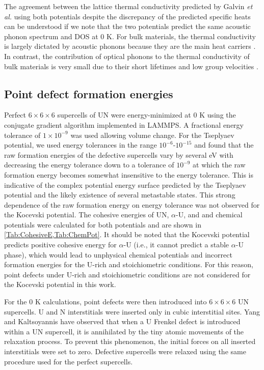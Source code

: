 \documentclass[preprint, 12pt]{elsarticle}
\begin{document}
The agreement between the lattice thermal conductivity predicted by Galvin \textit{et al.} \cite{Galvin2023} using both potentials despite the discrepancy of the predicted specific heats can be understood if we note that the two potentials predict the same acoustic phonon spectrum and DOS at 0 K. For bulk materials, the thermal conductivity is largely dictated by acoustic phonons because they are the main heat carriers \cite{Li2020}. In contrast, the contribution of optical phonons to the thermal conductivity of bulk materials is very small due to their short lifetimes and low group velocities \cite{Tian2011}.



\subsection{Point defect formation energies}

Perfect $6 \times 6 \times 6$ supercells of UN were energy-minimized at 0 K using the conjugate gradient algorithm implemented in LAMMPS. A fractional energy tolerance of $1 \times 10^{-9}$ was used allowing volume change. For the Tseplyaev potential, we used energy tolerances in the range $10^{-6}$-$10^{-15}$ and found that the raw formation energies of the defective supercells vary by several eV with decreasing the energy tolerance down to a tolerance of $10^{-9}$ at which the raw formation energy becomes somewhat insensitive to the energy tolerance. This is indicative of the complex potential energy surface predicted by the Tseplyaev potential and the likely existence of several metastable states. This strong dependence of the raw formation energy on energy tolerance was not observed for the Kocevski potential. The cohesive energies of UN, $\alpha$-U, and  and chemical potentials were calculated for both potentials and are shown in \cref{Tab:CohesiveE,Tab:ChemPot}. It should be noted that the Kocevski potential predicts positive cohesive energy for $\alpha$-U (i.e., it cannot predict a stable $\alpha$-U phase), which would lead to unphysical chemical potentials and incorrect formation energies for the U-rich and stoichiometric conditions. For this reason, point defects under U-rich and stoichiometric conditions are not considered for the Kocevski potential in this work. 

For the 0 K calculations, point defects were then introduced into $6 \times 6 \times 6$ UN supercells. U and N interstitials were inserted only in cubic interstitial sites. Yang and Kaltsoyannis \cite{Yang2021} have observed that when a U Frenkel defect is introduced within a UN supercell, it is annihilated by the tiny atomic movements of the relaxation process. To prevent this phenomenon, the initial forces on all inserted interstitials were set to zero. Defective supercells were relaxed using the same procedure used for the perfect supercells.
\end{document}

